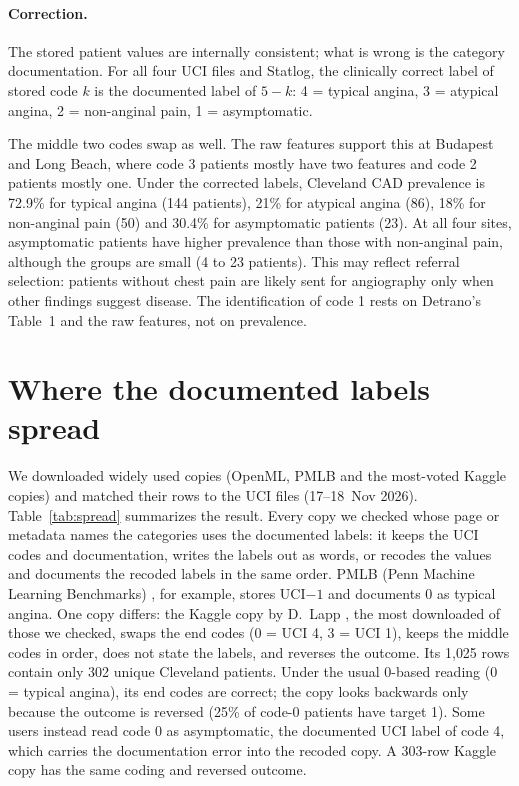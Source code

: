 \documentclass[11pt]{article}
\begin{document}
\paragraph{Correction.}
The stored patient values are internally consistent; what is wrong is the category documentation. For all four UCI files and Statlog, the clinically correct label of stored code $k$ is the documented label of $5-k$: 4 = typical angina, 3 = atypical angina, 2 = non-anginal pain, 1 = asymptomatic.

The middle two codes swap as well. The raw features support this at Budapest and Long Beach, where code 3 patients mostly have two features and code 2 patients mostly one. %
Under the corrected labels, Cleveland CAD prevalence is 72.9\% for typical angina (144 patients), 21\% for atypical angina (86), 18\% for non-anginal pain (50) and 30.4\% for asymptomatic patients (23). %
At all four sites, asymptomatic patients have higher prevalence than those with non-anginal pain, although the groups are small (4 to 23 patients). This may reflect referral selection: patients without chest pain are likely sent for angiography only when other findings suggest disease. The identification of code 1 rests on Detrano's Table~1 and the raw features, not on prevalence.

\section{Where the documented labels spread}\label{sec:spread}

We downloaded widely used copies (OpenML, PMLB and the most-voted Kaggle copies) and matched their rows to the UCI files (17--18~Nov 2026). Table~\ref{tab:spread} summarizes the result. Every copy we checked whose page or metadata names the categories uses the documented labels: it keeps the UCI codes and documentation, writes the labels out as words, or recodes the values and documents the recoded labels in the same order. PMLB (Penn Machine Learning Benchmarks) \cite{pmlb}, for example, stores UCI$-1$ and documents 0 as typical angina. One copy differs: the Kaggle copy by D.~Lapp \cite{kagglelapp}, the most downloaded of those we checked, swaps the end codes (0 = UCI 4, 3 = UCI 1), keeps the middle codes in order, does not state the labels, and reverses the outcome. Its 1{,}025 rows contain only 302 unique Cleveland patients. Under the usual 0-based reading (0 = typical angina), its end codes are correct; the copy looks backwards only because the outcome is reversed (25\% of code-0 patients have target 1). Some users instead read code 0 as asymptomatic, the documented UCI label of code 4, which carries the documentation error into the recoded copy. A 303-row Kaggle copy \cite{kagglenaresh} has the same coding and reversed outcome.
\end{document}
